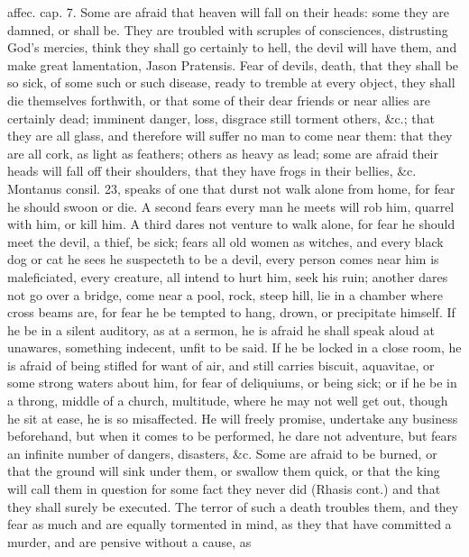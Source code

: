 {affec. cap. 7. Some are afraid that heaven will fall on their heads:
some they are damned, or shall be. They are troubled with
scruples of consciences, distrusting God's mercies, think they shall go
certainly to hell, the devil will have them, and make great
lamentation, Jason Pratensis. Fear of devils, death, that they shall be
so sick, of some such or such disease, ready to tremble at every
object, they shall die themselves forthwith, or that some of their dear
friends or near allies are certainly dead; imminent danger, loss,
disgrace still torment others, \&c.; that they are all glass, and
therefore will suffer no man to come near them: that they are all cork,
as light as feathers; others as heavy as lead; some are afraid their
heads will fall off their shoulders, that they have frogs in their
bellies, \&c. Montanus consil. 23, speaks of one that durst not
walk alone from home, for fear he should swoon or die. A second
fears every man he meets will rob him, quarrel with him, or kill
him. A third dares not venture to walk alone, for fear he should meet
the devil, a thief, be sick; fears all old women as witches, and every
black dog or cat he sees he suspecteth to be a devil, every person
comes near him is maleficiated, every creature, all intend to hurt him,
seek his ruin; another dares not go over a bridge, come near a pool,
rock, steep hill, lie in a chamber where cross beams are, for fear he
be tempted to hang, drown, or precipitate himself. If he be in a silent
auditory, as at a sermon, he is afraid he shall speak aloud at
unawares, something indecent, unfit to be said. If he be locked in a
close room, he is afraid of being stifled for want of air, and still
carries biscuit, aquavitae, or some strong waters about him, for fear
of deliquiums, or being sick; or if he be in a throng, middle of a
church, multitude, where he may not well get out, though he sit at
ease, he is so misaffected. He will freely promise, undertake any
business beforehand, but when it comes to be performed, he dare not
adventure, but fears an infinite number of dangers, disasters, \&c. Some
are  afraid to be burned, or that the ground will sink
under them, or swallow them quick, or that the king will call
them in question for some fact they never did (Rhasis cont.) and that
they shall surely be executed. The terror of such a death troubles
them, and they fear as much and are equally tormented in mind, as
they that have committed a murder, and are pensive without a cause, as
}
